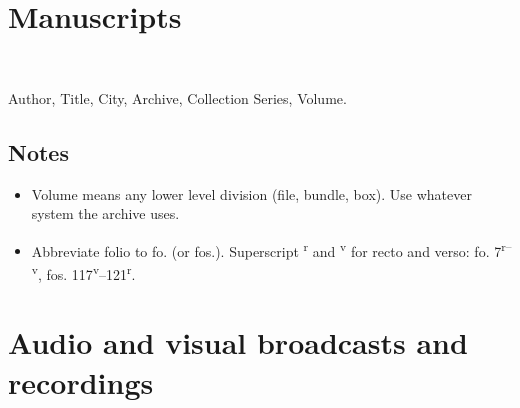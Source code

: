 \documentclass[extrafontsizes,11pt,a4paper,oneside]{memoir}
\begin{document}
    \section{Manuscripts}\label{sec:ms}
    
    \begin{description}
        \item[Form]~
        \item Author, Title, City, Archive, Collection Series, Volume.
    \end{description}
    
    \subsection{Notes}
    \begin{itemize}
        \item Volume means any lower level division (file, bundle, box). Use whatever system the archive uses.
        \item Abbreviate folio to fo. (or fos.). Superscript \textsuperscript{r} and \textsuperscript{v} for recto and verso: fo. 7\textsuperscript{r--v}, fos. 117\textsuperscript{v}--121\textsuperscript{r}.
    \end{itemize}
    
    \section{Audio and visual broadcasts and recordings}\label{sec:audiovideo}
    
\end{document}
